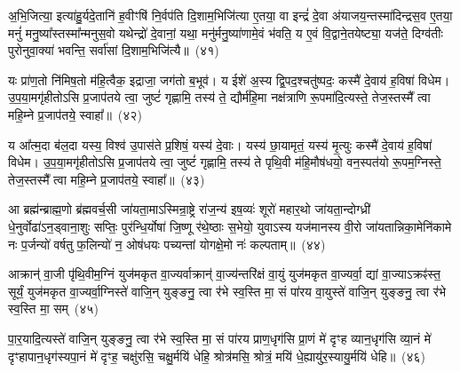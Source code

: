 अ॒भि॒जित्या॒ इत्या॑हु॒र्यदे॒तानि॑ ह॒वीꣳषि॑ नि॒र्वप॑ति दि॒शाम॒भिजि॑त्या ए॒तया॒ वा इन्द्रं॑ दे॒वा अ॑याजय॒न्तस्मा॑दिन्द्रस॒व ए॒तया॒ मनुं॑ मनु॒ष्या᳚स्तस्मा᳚न्मनुस॒वो यथेन्द्रो॑ दे॒वानां॒ यथा॒ मनु॑र्मनु॒ष्या॑णामे॒वं भ॑वति॒ य ए॒वं वि॒द्वाने॒तयेष्ट्या॒ यज॑ते॒ दिग्व॑तीः पुरोनुवा॒क्या॑ भवन्ति॒ सर्वा॑सां दि॒शाम॒भिजि॑त्यै॥~(४१)

{\anuvakamend[{अशा᳚न्तः सुषुवा॒णेनैक॑चत्वारिꣳशच्च}]}%

यः प्रा॑ण॒तो नि॑मिष॒तो म॑हि॒त्वैक॒ इद्राजा॒ जग॑तो ब॒भूव॑। य ईशे॑ अ॒स्य द्वि॒पद॒श्चतु॑ष्पदः॒ कस्मै॑ दे॒वाय॑ ह॒विषा॑ विधेम। उ॒प॒या॒मगृ॑हीतो\-ऽसि प्र॒जा\-प॑तये त्वा॒ जुष्टं॑ गृह्णामि॒ तस्य॑ ते॒ द्यौर्म॑हि॒मा नक्ष॑त्राणि रू॒पमा॑दि॒त्यस्ते॒ तेज॒स्तस्मै᳚ त्वा महि॒म्ने प्र॒जा\-प॑तये॒ स्वाहा᳚॥~(४२)

{\anuvakamend[{यः प्रा॑ण॒तो द्यौरा॑दि॒त्यो᳚\-ऽष्टात्रिꣳ॑शत्}]}%

य आ᳚त्म॒दा ब॑ल॒दा यस्य॒ विश्व॑ उ॒पास॑ते प्र॒शिषं॒ यस्य॑ दे॒वाः। यस्य॑ छा॒यामृतं॒ यस्य॑ मृ॒त्युः कस्मै॑ दे॒वाय॑ ह॒विषा॑ विधेम। उ॒प॒या॒मगृ॑हीतो\-ऽसि प्र॒जा\-प॑तये त्वा॒ जुष्टं॑ गृह्णामि॒ तस्य॑ ते पृथि॒वी म॑हि॒मौष॑धयो॒ वन॒स्पत॑यो रू॒पम॒ग्निस्ते॒ तेज॒स्तस्मै᳚ त्वा महि॒म्ने प्र॒जा\-प॑तये॒ स्वाहा᳚॥~(४३)

{\anuvakamend[{य आ᳚त्म॒दाः पृ॑थि॒व्य॑ग्निरेका॒न्नच॑त्वारि॒ꣳ॒शत्}]}%

आ ब्रह्म॑न्ब्राह्म॒णो ब्र॑ह्मवर्च॒सी जा॑यता॒मा\-ऽस्मिन्रा॒ष्ट्रे रा॑ज॒न्य॑ इष॒व्यः॑ शूरो॑ महार॒थो जा॑यता॒न्दोग्ध्री॑ धे॒नुर्वोढा॑\-ऽ\-न॒ड्वाना॒शुः सप्तिः॒ पुर॑न्धि॒र्योषा॑ जि॒ष्णू र॑थे॒ष्ठाः स॒भेयो॒ युवा\-ऽस्य यज॑मानस्य वी॒रो जा॑यतान्निका॒मेनि॑कामे नः प॒र्जन्यो॑ वर्\mbox{}षतु फ॒लिन्यो॑ न॒ ओष॑धयः पच्यन्तां योगक्षे॒मो नः॑ कल्पताम्॥~(४४)

{\anuvakamend[{आ ब्रह्म॒न्नेक॑चत्वारिꣳशत्}]}%

आक्रान्॑ वा॒जी पृ॑थि॒वीम॒ग्निं युज॑मकृत वा॒ज्यर्वाक्रान्॑ वा॒ज्य॑न्तरि॑क्षं वा॒युं युज॑मकृत वा॒ज्यर्वा॒ द्यां वा॒ज्या\-ऽक्रꣴ॑स्त॒ सूर्यं॒ युज॑मकृत वा॒ज्यर्वा॒ग्निस्ते॑ वाजि॒न् युङ्ङनु॒ त्वा र॑भे स्व॒स्ति मा॒ सं पा॑रय वा॒युस्ते॑ वाजि॒न् युङ्ङनु॒ त्वा र॑भे स्व॒स्ति मा॒ सम्~(४५)

पा॒र॒यादि॒त्यस्ते॑ वाजि॒न् युङ्ङनु॒ त्वा र॑भे स्व॒स्ति मा॒ सं पा॑रय प्राण॒धृग॑सि प्रा॒णं मे॑ दृꣳह व्यान॒धृग॑सि व्या॒नं मे॑ दृꣳहापान॒धृग॑स्यपा॒नं मे॑ दृꣳह॒ चक्षु॑रसि॒ चक्षु॒र्मयि॑ धेहि॒ श्रोत्र॑मसि॒ श्रोत्रं॒ मयि॑ धे॒ह्यायु॑र॒स्यायु॒र्मयि॑ धेहि॥~(४६)

{\anuvakamend[{वा॒युस्ते॑ वाजि॒न् युङ्ङनु॒ त्वा र॑भे स्व॒स्ति मा॒ सन्त्रिच॑त्वारिꣳशच्च}]}%

